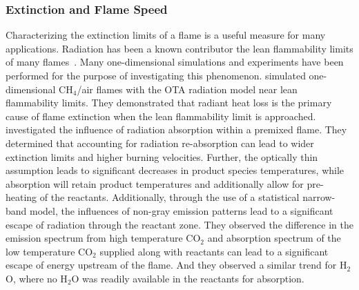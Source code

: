 \subsubsection{Extinction and Flame Speed}
Characterizing the extinction limits of a flame is a useful measure for many applications. Radiation has been a known contributor the lean flammability limits of many flames~\cite{Ju2000AsymptoticFlames,Liu2020TheFlames}.
Many one-dimensional simulations and experiments have been performed for the purpose of investigating this phenomenon.
\citet{Lakshmisha1991OnChemistry} simulated one-dimensional CH$_4$/air flames with the OTA radiation model near lean flammability limits. They demonstrated that radiant heat loss is the primary cause of flame extinction when the lean flammability limit is approached.
\citet{Ju1998EffectsFlames} investigated the influence of radiation absorption within a premixed flame.
They determined that accounting for radiation re-absorption can lead to wider extinction limits and higher burning velocities. Further, the optically thin assumption leads to significant decreases in product species temperatures, while absorption will retain product temperatures and additionally allow for pre-heating of the reactants.
Additionally, through the use of a statistical narrow-band model, the influences of non-gray emission patterns lead to a significant escape of radiation through the reactant zone. They observed the difference in the emission spectrum from high temperature CO$_2$ and absorption spectrum of the low temperature CO$_2$ supplied along with reactants can lead to a significant escape of energy upstream of the flame. And they observed a similar trend for H$_2$O, where no H$_2$O was readily available in the reactants for absorption.

